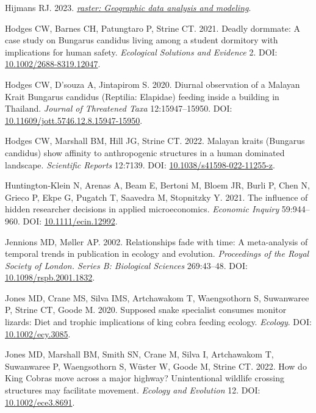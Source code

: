 \documentclass[10pt,a4paper]{article}
\newlength{\cslhangindent}
\newenvironment{CSLReferences}[2] %
 {\begin{list}{}{%
  \setlength{\itemindent}{0pt}
  \setlength{\leftmargin}{0pt}
  \setlength{\parsep}{0pt}
  \ifodd #1
   \setlength{\leftmargin}{\cslhangindent}
   \setlength{\itemindent}{-1\cslhangindent}
  \fi
  \setlength{\itemsep}{#2\baselineskip}}}
 {\end{list}}
\begin{document}
\begin{CSLReferences}{1}{0}
Hijmans RJ. 2023. \emph{\href{https://CRAN.R-project.org/package=raster}{{raster}: Geographic data analysis and modeling}}.

Hodges CW, Barnes CH, Patungtaro P, Strine CT. 2021. Deadly dormmate: {A} case study on {Bungarus} {candidus} living among a student dormitory with implications for human safety. \emph{Ecological Solutions and Evidence} 2. DOI: \href{https://doi.org/10.1002/2688-8319.12047}{10.1002/2688-8319.12047}.

Hodges CW, D'souza A, Jintapirom S. 2020. Diurnal observation of a {Malayan} {Krait} {Bungarus} candidus ({Reptilia}: {Elapidae}) feeding inside a building in {Thailand}. \emph{Journal of Threatened Taxa} 12:15947--15950. DOI: \href{https://doi.org/10.11609/jott.5746.12.8.15947-15950}{10.11609/jott.5746.12.8.15947-15950}.

Hodges CW, Marshall BM, Hill JG, Strine CT. 2022. Malayan kraits ({Bungarus} candidus) show affinity to anthropogenic structures in a human dominated landscape. \emph{Scientific Reports} 12:7139. DOI: \href{https://doi.org/10.1038/s41598-022-11255-z}{10.1038/s41598-022-11255-z}.

Huntington‐Klein N, Arenas A, Beam E, Bertoni M, Bloem JR, Burli P, Chen N, Grieco P, Ekpe G, Pugatch T, Saavedra M, Stopnitzky Y. 2021. The influence of hidden researcher decisions in applied microeconomics. \emph{Economic Inquiry} 59:944--960. DOI: \href{https://doi.org/10.1111/ecin.12992}{10.1111/ecin.12992}.

Jennions MD, Møller AP. 2002. Relationships fade with time: A meta-analysis of temporal trends in publication in ecology and evolution. \emph{Proceedings of the Royal Society of London. Series B: Biological Sciences} 269:43--48. DOI: \href{https://doi.org/10.1098/rspb.2001.1832}{10.1098/rspb.2001.1832}.

Jones MD, Crane MS, Silva IMS, Artchawakom T, Waengsothorn S, Suwanwaree P, Strine CT, Goode M. 2020. Supposed snake specialist consumes monitor lizards: Diet and trophic implications of king cobra feeding ecology. \emph{Ecology}. DOI: \href{https://doi.org/10.1002/ecy.3085}{10.1002/ecy.3085}.

Jones MD, Marshall BM, Smith SN, Crane M, Silva I, Artchawakom T, Suwanwaree P, Waengsothorn S, Wüster W, Goode M, Strine CT. 2022. How do {King} {Cobras} move across a major highway? {Unintentional} wildlife crossing structures may facilitate movement. \emph{Ecology and Evolution} 12. DOI: \href{https://doi.org/10.1002/ece3.8691}{10.1002/ece3.8691}.


\end{CSLReferences}
\end{document}
